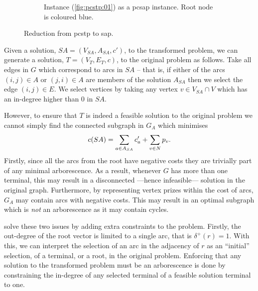 \begin{figure}[h]
\begin{subfigure}[t]{0.47\linewidth}
    \caption{Instance (\ref{fig:pcstp:01}) as a \gls{pcsap} instance. Root node is coloured blue.}
  \end{subfigure}
  \caption{Reduction from \gls{pcstp} to \gls{sap}.}
  \label{fig:pcstptosap}
\end{figure}

Given a solution, $SA = (V_{SA}, A_{SA}, c')$,
to the transformed problem, we can generate a solution, $T = (V_T, E_T, c)$, to the
original problem as follows.
Take all edges in $G$ which correspond to arcs in $SA$ -- that is, if either of the arcs
$(i, j) \in A$ or $(j, i) \in A$ are members of the solution $A_{SA}$ then we select the edge $(i,j) \in E$.
We select vertices by taking any vertex $v \in V_{SA} \cap V$ which has an in-degree higher than 0 in
$SA$.

However, to ensure that $T$ is indeed a feasible solution to the original problem we
cannot simply find the connected subgraph in $G_A$ which minimises
\[c(SA) = \sum_{a \in A_{SA}} c'_{a} + \sum_{v \in N} p_v\mathnormal{.}\]
Firstly, since all the arcs from the root have negative costs they are trivially part of any minimal arborescence.
As a result, whenever $G$ has more than one terminal, this may result in a disconnected
---hence infeasible---
solution in the original graph.
Furthermore, by representing vertex prizes within the cost of arcs,
 $G_A$  may contain arcs with negative costs. This may result in an
optimal subgraph which is \textit{not} an arborescence as it may contain cycles.

\citet{ljubic2005solving} solve these two issues by adding extra constraints to the problem. Firstly, the
out-degree of the root vector is limited to a single arc, that is $\delta^+(r) = 1$. With this,
we can interpret the selection of an arc in the adjacency of $r$ as an ``initial'' selection,
 of a terminal, or a root,
in the original problem. Enforcing that any solution to the transformed problem must be an arborescence
 is done by constraining the in-degree of any selected terminal of a feasible solution terminal to one.

